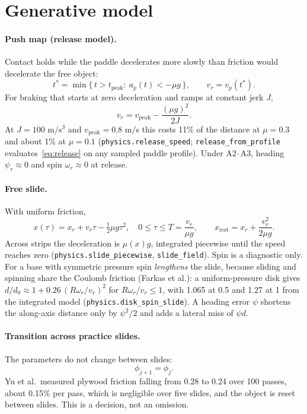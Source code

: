 \documentclass[10pt]{article}
\newcommand{\code}[1]{\texttt{#1}}
\begin{document}
\section{Generative model}
\label{sec:generative}
\paragraph{Push map (release model).}  Contact holds while the paddle decelerates more slowly than friction would
decelerate the free object:
\begin{equation}
t^{*}=\min\{\,t>t_{\text{peak}}:\ a_p(t)<-\mu g\,\},\qquad v_r=v_p(t^{*}).
\label{eq:release}
\end{equation}
For braking that starts at zero deceleration and ramps at constant jerk $J$,
\begin{equation}
v_r=v_{\text{peak}}-\frac{(\mu g)^2}{2J}.
\label{eq:vr}
\end{equation}
At $J=100$ m/s$^3$ and $v_{\text{peak}}=0.8$ m/s this costs 11\% of the distance at $\mu=0.3$ and about 1\% at
$\mu=0.1$ (\code{physics.release\_speed}; \code{release\_from\_profile} evaluates~\eqref{eq:release} on any sampled
paddle profile).  Under A2--A3, heading $\psi_r\approx0$ and spin $\omega_r\approx0$ at release.

\paragraph{Free slide.}  With uniform friction,
\begin{equation}
x(\tau)=x_r+v_r\tau-\tfrac12\mu g\tau^{2},\quad 0\le\tau\le T=\frac{v_r}{\mu g},\qquad
x_{\text{rest}}=x_r+\frac{v_r^{2}}{2\mu g}.
\label{eq:slide}
\end{equation}
Across strips the deceleration is $\mu(x)g$, integrated piecewise until the speed reaches zero
(\code{physics.slide\_piecewise}, \code{slide\_field}).  Spin is a diagnostic only.  For a base with symmetric
pressure spin \emph{lengthens} the slide, because sliding and spinning share the Coulomb friction (Farkas et al.):
a uniform-pressure disk gives $d/d_0\approx1+0.26\,(R\omega_r/v_r)^2$ for $R\omega_r/v_r\le1$, with 1.065 at 0.5 and
1.27 at 1 from the integrated model (\code{physics.disk\_spin\_slide}).  A heading error $\psi$ shortens the
along-axis distance only by $\psi^2/2$ and adds a lateral miss of $\psi d$.

\paragraph{Transition across practice slides.}  The parameters do not change between slides:
\begin{equation}
\phi_{j+1}=\phi_j .
\end{equation}
Yu et al.\ measured plywood friction falling from 0.28 to 0.24 over 100 passes, about 0.15\% per pass, which is
negligible over five slides, and the object is reset between slides.  This is a decision, not an omission.
\end{document}
